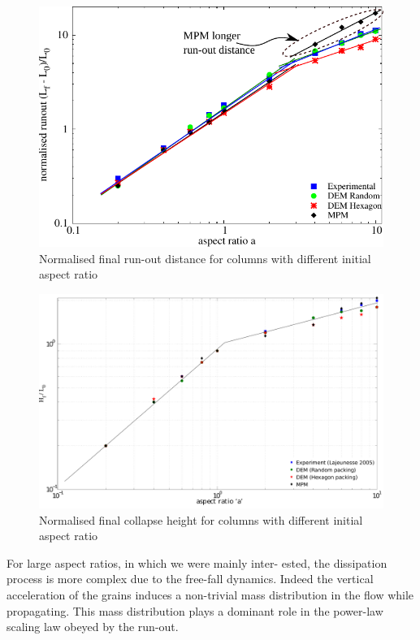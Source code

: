 \begin{figure}[tbhp]
\centering
\includegraphics[width=\textwidth]{runout}
\caption{Normalised final run-out distance for columns with different initial 
aspect ratio}
\label{fig:run-out}
\end{figure}

\begin{figure}[tbhp]
\centering
\includegraphics[width=\textwidth]{height}
\caption{Normalised final collapse height for columns with different initial 
aspect ratio}
\label{fig:height}
\end{figure}

For large aspect ratios, in which we were mainly inter-
ested, the dissipation process is more complex due to
the free-fall dynamics. Indeed the vertical acceleration
of the grains induces a non-trivial mass distribution in
the flow while propagating. This mass distribution plays
a dominant role in the power-law scaling law obeyed by the run-out.

